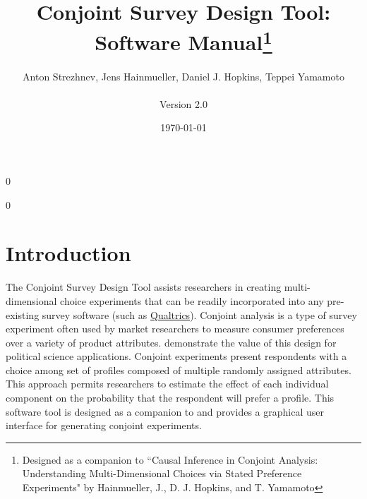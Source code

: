 \documentclass[12pt]{article}
\newcommand\spacingset[1]{\renewcommand{\baselinestretch}{#1}\small\normalsize}
\begin{document}

\newcommand{\blind}{0}

\newcommand{\tit}{Conjoint Survey Design Tool: Software Manual\thanks{Designed as a companion to ``Causal Inference in Conjoint Analysis: Understanding Multi-Dimensional Choices via Stated Preference Experiments" by Hainmueller, J., D. J. Hopkins, and T. Yamamoto}}

\blind
\title{\bf \tit}
  \author{Anton Strezhnev, Jens Hainmueller, Daniel J. Hopkins, Teppei Yamamoto\\\\Version 2.0}

\date{\today}
\maketitle
{}\blind
\maketitle
\fi


\thispagestyle{empty}
\setcounter{page}{0}
\spacingset{1}

\clearpage



\spacingset{1.5}

\tableofcontents
\clearpage
\section{Introduction}

The Conjoint Survey Design Tool assists researchers in creating multi-dimensional choice experiments that can be readily incorporated into any pre-existing survey software (such as \href{http://www.qualtrics.com/}{Qualtrics}). Conjoint analysis is a type of survey experiment often used by market researchers to measure consumer preferences over a variety of product attributes. \cite{hainmueller2013} demonstrate the value of this design for political science applications. Conjoint experiments present respondents with a choice among set of profiles composed of multiple randomly assigned attributes. This approach permits researchers to estimate the effect of each individual component on the probability that the respondent will prefer a profile. This software tool is designed as a companion to \cite{hainmueller2013} and provides a graphical user interface for generating conjoint experiments.
\end{document}
